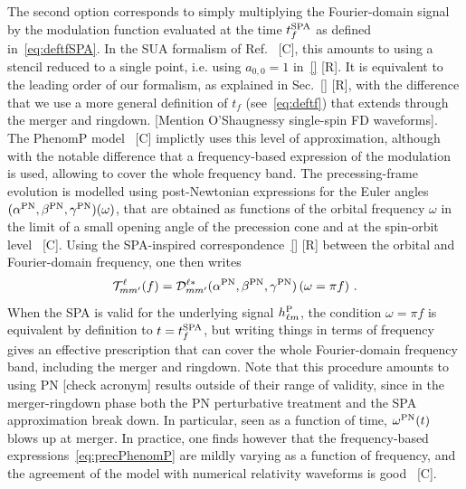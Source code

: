 \documentclass[aps,showpacs,twocolumn,
prd,superscriptaddress,nofootinbib]{revtex4-1}
\newcommand{\be}{\begin{equation}}
\newcommand{\ee}{\end{equation}}
\newcommand\calT{{\mathcal{T}}}
\newcommand\calD{{\mathcal{D}}}
\newcommand{\SM}[1]{{\color{Red} #1}}
\begin{document}
The second option corresponds to simply multiplying the Fourier-domain signal by the modulation function evaluated at the time $t_{f}^{\rm SPA}$ as defined in~\eqref{eq:deftfSPA}. In the SUA formalism of Ref.~\cite{} \SM{[C]}, this amounts to using a stencil reduced to a single point, i.e. using $a_{0,0} = 1$ in~\eqref{} \SM{[R]}. It is equivalent to the leading order of our formalism, as explained in Sec.~\ref{} \SM{[R]}, with the difference that we use a more general definition of $t_{f}$ (see~\eqref{eq:deftf}) that extends through the merger and ringdown. \SM{[Mention O'Shaugnessy single-spin FD waveforms]}. The PhenomP model~\cite{} \SM{[C]} implictly uses this level of approximation, although with the notable difference that a frequency-based expression of the modulation is used, allowing to cover the whole frequency band. The precessing-frame evolution is modelled using post-Newtonian expressions for the Euler angles $(\alpha^{\rm PN}, \beta^{\rm PN}, \gamma^{\rm PN}) (\omega)$, that are obtained as functions of the orbital frequency $\omega$ in the limit of a small opening angle of the precession cone and at the spin-orbit level~\cite{} \SM{[C]}. Using the SPA-inspired correspondence~\eqref{} \SM{[R]} between the orbital and Fourier-domain frequency, one then writes 
\be\label{eq:precPhenomP}
	\calT^{\ell}_{mm'}(f) = \calD^{\ell *}_{mm'}(\alpha^{\rm PN}, \beta^{\rm PN}, \gamma^{\rm PN}) \left( \omega=\pi f\right) \,.
\ee
When the SPA is valid for the underlying signal $h^{\rm P}_{\ell m}$, the condition $\omega = \pi f$ is equivalent by definition to $t=t^{\rm SPA}_{f}$, but writing things in terms of frequency gives an effective prescription that can cover the whole Fourier-domain frequency band, including the merger and ringdown. Note that this procedure amounts to using PN \SM{[check acronym]} results outside of their range of validity, since in the merger-ringdown phase both the PN perturbative treatment and the SPA approximation break down. In particular, seen as a function of time, $\omega^{\rm PN}(t)$ blows up at merger. In practice, one finds however that the frequency-based expressions~\eqref{eq:precPhenomP} are mildly varying as a function of frequency, and the agreement of the model with numerical relativity waveforms is good~\cite{} \SM{[C]}. 
\end{document}
